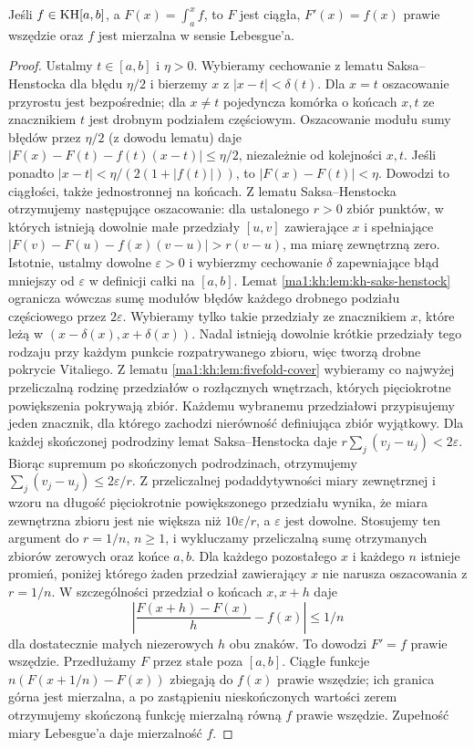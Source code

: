 \begin{twierdzenie}\label{ma1:kh:thm:kh-primitive-derivative}\label{it:thm:kh-primitive-derivative}
Jeśli $f\in\mathrm{KH}[a,b]$, a $F(x)=\int_a^x f$, to $F$ jest ciągła, $F'(x)=f(x)$ prawie wszędzie oraz $f$ jest mierzalna w sensie Lebesgue'a.
\end{twierdzenie}
\begin{proof}
Ustalmy $t\in[a,b]$ i $\eta>0$. Wybieramy cechowanie z lematu Saksa--Henstocka dla błędu $\eta/2$ i bierzemy $x$ z $|x-t|<\delta(t)$. Dla $x=t$ oszacowanie przyrostu jest bezpośrednie; dla $x\ne t$ pojedyncza komórka o końcach $x,t$ ze znacznikiem $t$ jest drobnym podziałem częściowym. Oszacowanie modułu sumy błędów przez $\eta/2$ (z dowodu lematu) daje
$|F(x)-F(t)-f(t)(x-t)|\le\eta/2$, niezależnie od kolejności $x,t$. Jeśli ponadto $|x-t|<\eta/(2(1+|f(t)|))$, to $|F(x)-F(t)|<\eta$. Dowodzi to ciągłości, także jednostronnej na końcach. Z lematu Saksa--Henstocka otrzymujemy następujące oszacowanie: dla ustalonego $r>0$ zbiór punktów, w których istnieją dowolnie małe przedziały $[u,v]$ zawierające $x$ i spełniające $|F(v)-F(u)-f(x)(v-u)|>r(v-u)$, ma miarę zewnętrzną zero. Istotnie, ustalmy dowolne $\varepsilon>0$ i wybierzmy cechowanie $\delta$ zapewniające błąd mniejszy od $\varepsilon$ w definicji całki na $[a,b]$. Lemat \ref{ma1:kh:lem:kh-saks-henstock} ogranicza wówczas sumę modułów błędów każdego drobnego podziału częściowego przez $2\varepsilon$. Wybieramy tylko takie przedziały ze znacznikiem $x$, które leżą w $(x-\delta(x),x+\delta(x))$. Nadal istnieją dowolnie krótkie przedziały tego rodzaju przy każdym punkcie rozpatrywanego zbioru, więc tworzą drobne pokrycie Vitaliego. Z lematu \ref{ma1:kh:lem:fivefold-cover} wybieramy co najwyżej przeliczalną rodzinę przedziałów o rozłącznych wnętrzach, których pięciokrotne powiększenia pokrywają zbiór. Każdemu wybranemu przedziałowi przypisujemy jeden znacznik, dla którego zachodzi nierówność definiująca zbiór wyjątkowy. Dla każdej skończonej podrodziny lemat Saksa--Henstocka daje $r\sum_j(v_j-u_j)<2\varepsilon$. Biorąc supremum po skończonych podrodzinach, otrzymujemy $\sum_j(v_j-u_j)\le2\varepsilon/r$. Z przeliczalnej podaddytywności miary zewnętrznej i wzoru na długość pięciokrotnie powiększonego przedziału wynika, że miara zewnętrzna zbioru jest nie większa niż $10\varepsilon/r$, a $\varepsilon$ jest dowolne. Stosujemy ten argument do $r=1/n$, $n\ge1$, i wykluczamy przeliczalną sumę otrzymanych zbiorów zerowych oraz końce $a,b$. Dla każdego pozostałego $x$ i każdego $n$ istnieje promień, poniżej którego żaden przedział zawierający $x$ nie narusza oszacowania z $r=1/n$. W szczególności przedział o końcach $x,x+h$ daje
\[
 \left|\frac{F(x+h)-F(x)}h-f(x)\right|\le1/n
\]
dla dostatecznie małych niezerowych $h$ obu znaków. To dowodzi $F'=f$ prawie wszędzie. Przedłużamy $F$ przez stałe poza $[a,b]$. Ciągłe funkcje $n(F(x+1/n)-F(x))$ zbiegają do $f(x)$ prawie wszędzie; ich granica górna jest mierzalna, a po zastąpieniu nieskończonych wartości zerem otrzymujemy skończoną funkcję mierzalną równą $f$ prawie wszędzie. Zupełność miary Lebesgue'a daje mierzalność $f$.
\end{proof}

